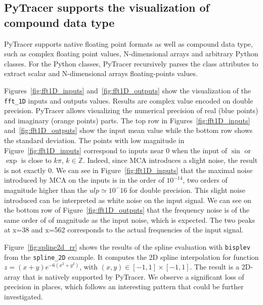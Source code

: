 \documentclass[10pt,journal,compsoc]{IEEEtran}
\newcommand{\pytracer}[0]{PyTracer\xspace}
\DeclareRobustCommand{\add}[1]{#1}
\begin{document}
\subsection{\pytracer supports the visualization of compound data type}

\add{PyTracer supports native floating point formats as well as compound data type,
    such as complex floating point values, N-dimensional arrays and arbitrary Python
    classes. For the Python classes, PyTracer recursively parses the class attributes to
    extract scalar and N-dimensional arrays floating-points values.}

Figures~\ref{fig:fft1D_inputs} and~\ref{fig:fft1D_outputs} \add{show the
    visualization of the \texttt{fft\_1D} inputs and outputs values. Results are
    complex value encoded on double precision. PyTracer allows visualizing the
    numerical precision of real (blue points) and imaginary (orange points) parts.}
\add{The} top row in Figures~\ref{fig:fft1D_inputs} and~\ref{fig:fft1D_outputs}
show the input mean value while the bottom row shows the standard deviation. The
points with low magnitude in Figure~\ref{fig:fft1D_inputs} correspond to inputs
near 0 when the input of $\sin$ or $\exp$ is close to $k\pi$, $k \in
    \mathbb{Z}$. Indeed, since MCA introduces a slight noise, the result is not
exactly 0. We can see in Figure~\ref{fig:fft1D_inputs} that the maximal noise
introduced by MCA on the inputs is in the order of $10^{-14}$, two orders of
magnitude higher than the $ulp \simeq 10^-16$ for double precision. This slight
noise introduced can be interpreted as white noise on the input signal. We can
see on the bottom row of Figure~\ref{fig:fft1D_outputs} that the frequency noise
is of the same order of of magnitude as the input noise, which is expected. The
two peaks at x=38 and x=562 corresponds to the actual frequencies of the input
signal.

Figure~\ref{fig:spline2d_rr} \add{shows the results of the spline evaluation with
    \texttt{bisplev} from the \texttt{spline\_2D} example. It computes the 2D spline
    interpolation for function $z=(x+y)e^{-6(x^2+y^2)}$, with $(x,y) \in
        [-1,1]\times[-1,1]$. The result is a 2D-array that is natively supported by
    PyTracer. We observe a significant loss of precision in places, which follows
    an interesting pattern that could be further investigated.}
\end{document}
